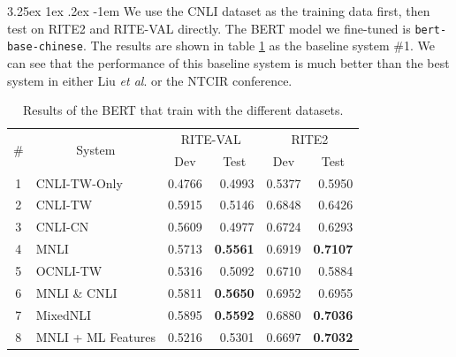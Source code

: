 \documentclass[12pt]{article}
\makeatletter
\renewcommand\paragraph{\@startsection{paragraph}{5}{\z@}%
  {3.25ex \@plus1ex \@minus.2ex}%
  {-1em}%
  {\normalfont\normalsize\bfseries}}
\makeatother
\begin{document}
\begin{CJK*}{UTF8}{bkai}
\begin{spacing}{1.77}
\paragraph{}
We use the CNLI dataset as the training data first, then test on RITE2 and RITE-VAL directly. The BERT model we fine-tuned is \texttt{bert-base-chinese}. The results are shown in table \ref{result:bert_compare} as the baseline system \#1. We can see that the performance of this baseline system is much better than the best system in either Liu \emph{et al}. or the NTCIR conference.

\begin{table}[H]
  \centering
  \setlength{\extrarowheight}{-3pt}
  \begin{tabular}{|c|l|r|r|r|r|}
  \hline
  \multirow{2}{*}{\#} & \multicolumn{1}{c|}{\multirow{2}{*}{System}} & \multicolumn{2}{c|}{RITE-VAL} & \multicolumn{2}{c|}{RITE2} \\ \cline{3-6}
   & \multicolumn{1}{c|}{} & \multicolumn{1}{c|}{Dev} & \multicolumn{1}{c|}{Test} & \multicolumn{1}{c|}{Dev} & \multicolumn{1}{c|}{Test} \\ \hline
  1 & CNLI-TW-Only & 0.4766 & 0.4993 & 0.5377 & 0.5950 \\ \hline
  2 & CNLI-TW & 0.5915 & 0.5146 & 0.6848 & 0.6426 \\ \hline
  3 & CNLI-CN & 0.5609 & 0.4977 & 0.6724 & 0.6293 \\ \hline
  4 & MNLI & 0.5713 & \textbf{0.5561} & 0.6919 & \textbf{0.7107} \\ \hline
  5 & OCNLI-TW & 0.5316 & 0.5092 & 0.6710 & 0.5884 \\ \hline
  6 & MNLI \& CNLI & 0.5811 & \textbf{0.5650} & 0.6952 & 0.6955 \\ \hline
  7 & MixedNLI & 0.5895 & \textbf{0.5592} & 0.6880 & \textbf{0.7036} \\ \hline
  8 & MNLI + ML Features & 0.5216 & 0.5301 & 0.6697 & \textbf{0.7032} \\ \hline
  \end{tabular}
  \caption{Results of the BERT that train with the different datasets.}
  \label{result:bert_compare}
\end{table}


\end{spacing}
\end{CJK*}
\end{document}

